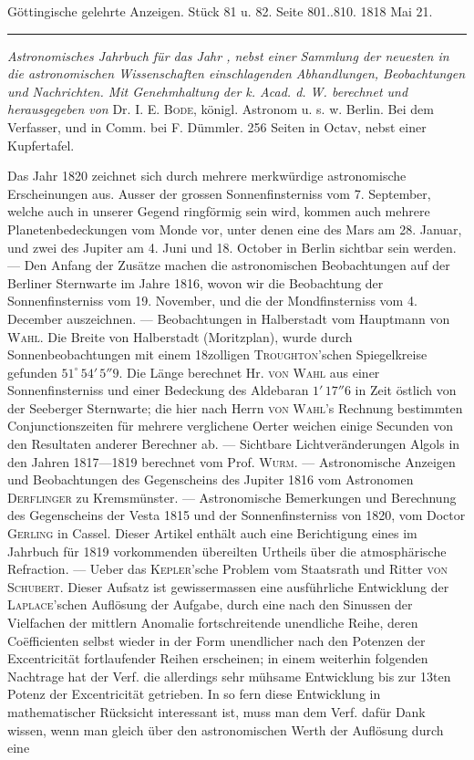 \clearpage
{}
\hypertarget{native-610-lower}{}
\begin{center}\small Göttingische gelehrte Anzeigen. Stück 81 u. 82. Seite 801..810. 1818 Mai 21.\\[3pt]\rule{.72\linewidth}{.3pt}\end{center}

\emph{Astronomisches Jahrbuch für das Jahr {}, nebst einer Sammlung der neuesten in die astronomischen Wissenschaften einschlagenden Abhandlungen, Beobachtungen und Nachrichten. Mit Genehmhaltung der k. Acad. d. W. berechnet und herausgegeben von} Dr. I. E. \textsc{Bode}, königl. Astronom u. s. w. Berlin. Bei dem Verfasser, und in Comm. bei F. Dümmler. 256 Seiten in Octav, nebst einer Kupfertafel.

Das Jahr 1820 zeichnet sich durch mehrere merkwürdige astronomische Erscheinungen aus. Ausser der grossen Sonnenfinsterniss vom 7. September, welche auch in unserer Gegend ringförmig sein wird, kommen auch mehrere Planetenbedeckungen vom Monde vor, unter denen eine des Mars am 28. Januar, und zwei des Jupiter am 4. Juni und 18. October in Berlin sichtbar sein werden. --- Den Anfang der Zusätze machen die astronomischen Beobachtungen auf der Berliner Sternwarte im Jahre 1816, wovon wir die Beobachtung der Sonnenfinsterniss vom 19. November, und die der Mondfinsterniss vom 4. December auszeichnen. --- Beobachtungen in Halberstadt vom Hauptmann von \textsc{Wahl}. Die Breite von Halberstadt (Moritzplan), wurde durch Sonnenbeobachtungen mit einem 18zolligen \textsc{Troughton}'schen Spiegelkreise gefunden $51^\circ\,54'\,5''9$. Die Länge berechnet Hr. \textsc{von Wahl} aus einer Sonnenfinsterniss und einer Bedeckung des Aldebaran $1'\,17''6$ in Zeit östlich von der Seeberger Sternwarte; die hier nach Herrn \textsc{von Wahl}'s Rechnung bestimmten Conjunctionszeiten für mehrere verglichene Oerter weichen einige Secunden von den Resultaten anderer Berechner ab. --- Sichtbare Lichtveränderungen Algols in den Jahren 1817---1819 berechnet vom Prof. \textsc{Wurm}. --- Astronomische Anzeigen und Beobachtungen des Gegenscheins des Jupiter 1816 vom Astronomen \textsc{Derflinger} zu Kremsmünster. --- Astronomische Bemerkungen und Berechnung des Gegenscheins der Vesta 1815 und der Sonnenfinsterniss von 1820, vom Doctor \textsc{Gerling} in Cassel. Dieser Artikel enthält auch eine Berichtigung eines im Jahrbuch für 1819 vorkommenden übereilten Urtheils über die atmosphärische Refraction. --- Ueber das \textsc{Kepler}'sche Problem vom Staatsrath und Ritter \textsc{von Schubert}. Dieser Aufsatz ist gewissermassen eine ausführliche Entwicklung der \textsc{Laplace}'schen Auflösung der Aufgabe, durch eine nach den Sinussen der Vielfachen der mittlern Anomalie fortschreitende unendliche Reihe, deren Coëfficienten selbst wieder in der Form unendlicher nach den Potenzen der Excentricität fortlaufender Reihen erscheinen; in einem weiterhin folgenden Nachtrage hat der Verf. die allerdings sehr mühsame Entwicklung bis zur 13ten Potenz der Excentricität getrieben. In so fern diese Entwicklung in mathematischer Rücksicht interessant ist, muss man dem Verf. dafür Dank wissen, wenn man gleich über den astronomischen Werth der Auflösung durch eine 